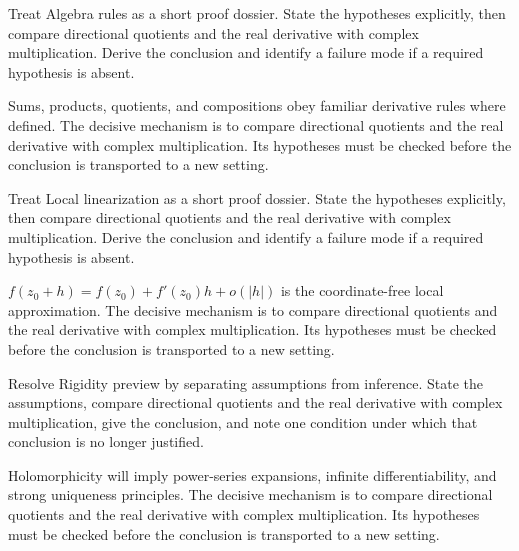 \begin{problem}\label{prob:iv01-problem-06}
Treat Algebra rules as a short proof dossier. State the hypotheses explicitly, then compare directional quotients and the real derivative with complex multiplication. Derive the conclusion and identify a failure mode if a required hypothesis is absent.
\end{problem}
\begin{solution}
Sums, products, quotients, and compositions obey familiar derivative rules where defined. The decisive mechanism is to compare directional quotients and the real derivative with complex multiplication. Its hypotheses must be checked before the conclusion is transported to a new setting.
\end{solution}

\begin{problem}\label{prob:iv01-problem-07}
Treat Local linearization as a short proof dossier. State the hypotheses explicitly, then compare directional quotients and the real derivative with complex multiplication. Derive the conclusion and identify a failure mode if a required hypothesis is absent.
\end{problem}
\begin{solution}
$f(z_0+h)=f(z_0)+f'(z_0)h+o(|h|)$ is the coordinate-free local approximation. The decisive mechanism is to compare directional quotients and the real derivative with complex multiplication. Its hypotheses must be checked before the conclusion is transported to a new setting.
\end{solution}

\begin{problem}\label{prob:iv01-problem-08}
Resolve Rigidity preview by separating assumptions from inference. State the assumptions, compare directional quotients and the real derivative with complex multiplication, give the conclusion, and note one condition under which that conclusion is no longer justified.
\end{problem}
\begin{solution}
Holomorphicity will imply power-series expansions, infinite differentiability, and strong uniqueness principles. The decisive mechanism is to compare directional quotients and the real derivative with complex multiplication. Its hypotheses must be checked before the conclusion is transported to a new setting.
\end{solution}

